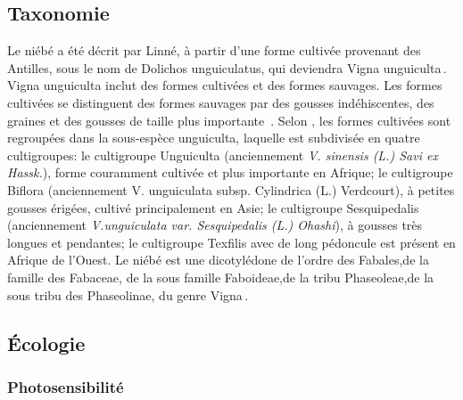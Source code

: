 \documentclass[a4paper,11pt]{article}
\begin{document}
\subsection{Taxonomie}

Le niébé a été décrit par Linné, à partir d’une forme cultivée
provenant des Antilles, sous le nom de Dolichos unguiculatus, qui
deviendra Vigna unguiculta\,\cite{Pasquet_1997}. Vigna unguiculta
inclut des formes cultivées et des formes sauvages. Les formes
cultivées se distinguent des formes sauvages par des gousses
indéhiscentes, des graines et des gousses de taille plus importante
\,\cite{Lush_1981}. Selon\,\citeauthor{Vanderborght_2001}\,\citeyear{Vanderborght_2001},
les formes cultivées sont regroupées dans la sous-espèce unguiculta,
laquelle est subdivisée en quatre cultigroupes: le cultigroupe
Unguiculta (anciennement \emph{ V. sinensis (L.) Savi ex Hassk.}),
forme couramment cultivée et plus importante en Afrique; le
cultigroupe Biflora (anciennement V. unguiculata subsp. Cylindrica
(L.) Verdcourt), à petites gousses érigées, cultivé principalement en
Asie; le cultigroupe Sesquipedalis (anciennement \emph{V.unguiculata
  var. Sesquipedalis (L.) Ohashi}), à gousses très longues et
pendantes; le cultigroupe Texfilis avec de long pédoncule est présent
en Afrique de l’Ouest. Le niébé est une dicotylédone de l’ordre des
Fabales,de la famille des Fabaceae, de la sous famille Faboideae,de la
tribu Phaseoleae,de la sous tribu des Phaseolinae, du genre
Vigna\,\cite{Verdcourt_1970, Marechal_1978}.

\subsection{Écologie}

\subsubsection{Photosensibilité}
\end{document}
